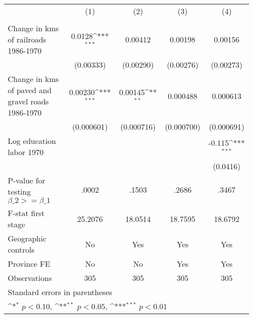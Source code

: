 {
\def\sym#1{\ifmmode^{#1}\else\(^{#1}\)\fi}
\begin{tabular}{l*{4}{c}}
\hline\hline
                &\multicolumn{1}{c}{(1)}&\multicolumn{1}{c}{(2)}&\multicolumn{1}{c}{(3)}&\multicolumn{1}{c}{(4)}\\
                &\multicolumn{1}{c}{}&\multicolumn{1}{c}{}&\multicolumn{1}{c}{}&\multicolumn{1}{c}{}\\
\hline
Change in kms of railroads 1986-1970&   0.0128\sym{***}&  0.00412         &  0.00198         &  0.00156         \\
                &(0.00333)         &(0.00290)         &(0.00276)         &(0.00273)         \\
[1em]
Change in kms of paved and gravel roads 1986-1970&  0.00230\sym{***}&  0.00145\sym{**} & 0.000488         & 0.000613         \\
                &(0.000601)         &(0.000716)         &(0.000700)         &(0.000691)         \\
[1em]
Log education labor 1970&                  &                  &                  &   -0.115\sym{***}\\
                &                  &                  &                  & (0.0416)         \\
\hline
P-value for testing $\beta\_{2} >= \beta\_{1}$&    .0002         &    .1503         &    .2686         &    .3467         \\
F-stat first stage&  25.2076         &  18.0514         &  18.7595         &  18.6792         \\
Geographic controls&       No         &      Yes         &      Yes         &      Yes         \\
Province FE     &       No         &       No         &      Yes         &      Yes         \\
Observations    &      305         &      305         &      305         &      305         \\
\hline\hline
\multicolumn{5}{l}{\footnotesize Standard errors in parentheses}\\
\multicolumn{5}{l}{\footnotesize \sym{*} \(p<0.10\), \sym{**} \(p<0.05\), \sym{***} \(p<0.01\)}\\
\end{tabular}
}

